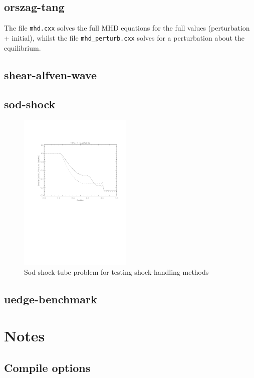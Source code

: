 \documentclass[12pt]{article}
\begin{document}
\subsection{orszag-tang}

The file \texttt{mhd.cxx} solves the full MHD equations for the full values (perturbation + initial),
whilst the file \texttt{mhd\_perturb.cxx} solves for a perturbation about the equilibrium.

\subsection{shear-alfven-wave}

\subsection{sod-shock}

\begin{figure}[h]
\includegraphics[width=0.48\textwidth, keepaspectratio]{figs/sod_result.pdf}
\caption{Sod shock-tube problem for testing shock-handling methods}
\end{figure}

\subsection{uedge-benchmark}

\section{Notes}

\subsection{Compile options}
\end{document}
